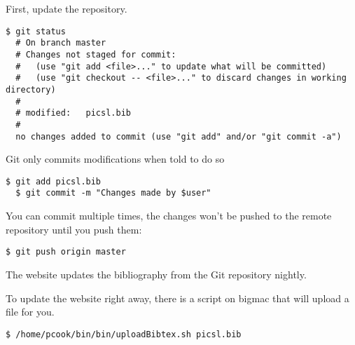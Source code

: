 \documentclass{InsightArticle}
\begin{document}
First, update the repository.

\begin{lstlisting}[style=bash]
  $ git status
  # On branch master
  # Changes not staged for commit:
  #   (use "git add <file>..." to update what will be committed)
  #   (use "git checkout -- <file>..." to discard changes in working directory)
  #
  #	modified:   picsl.bib
  #
  no changes added to commit (use "git add" and/or "git commit -a")
\end{lstlisting}

Git only commits modifications when told to do so
\begin{lstlisting}[style=bash]
  $ git add picsl.bib
  $ git commit -m "Changes made by $user" 
\end{lstlisting}

You can commit multiple times, the changes won't be pushed to the remote repository until you push them:
\begin{lstlisting}[style=bash]
  $ git push origin master 
\end{lstlisting}

The website updates the bibliography from the Git repository nightly.

To update the website right away, there is a script on bigmac that will upload a file for you.
\begin{lstlisting}[style=bash]
  $ /home/pcook/bin/bin/uploadBibtex.sh picsl.bib
\end{lstlisting}



\end{document}
